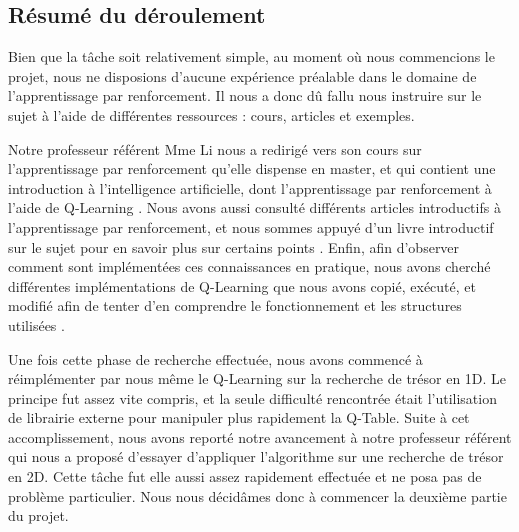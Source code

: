 \subsection{Résumé du déroulement}
Bien que la tâche soit relativement simple, au moment où nous commencions le projet, nous ne disposions d'aucune expérience préalable dans le domaine de l'apprentissage par renforcement. Il nous a donc dû fallu nous instruire sur le sujet à l'aide de différentes ressources : cours, articles et exemples.
\par
Notre professeur référent Mme Li nous a redirigé vers son cours sur l'apprentissage par renforcement qu'elle dispense en master, et qui contient une introduction à l'intelligence artificielle, dont l'apprentissage par renforcement à l'aide de Q-Learning \cite{li_rl}. Nous avons aussi consulté différents articles introductifs à l'apprentissage par renforcement, et nous sommes appuyé d'un livre introductif sur le sujet pour en savoir plus sur certains points \cite{rl_an_intro}. Enfin, afin d'observer comment sont implémentées ces connaissances en pratique, nous avons cherché différentes implémentations de Q-Learning que nous avons copié, exécuté, et modifié afin de tenter d'en comprendre le fonctionnement et les structures utilisées \cite{morvanzhou}.
\par
Une fois cette phase de recherche effectuée, nous avons commencé à réimplémenter par nous même le Q-Learning sur la recherche de trésor en 1D. Le principe fut assez vite compris, et la seule difficulté rencontrée était l'utilisation de librairie externe pour manipuler plus rapidement la Q-Table. Suite à cet accomplissement, nous avons reporté notre avancement à notre professeur référent qui nous a proposé d'essayer d'appliquer l'algorithme sur une recherche de trésor en 2D. Cette tâche fut elle aussi assez rapidement effectuée et ne posa pas de problème particulier. Nous nous décidâmes donc à commencer la deuxième partie du projet.

